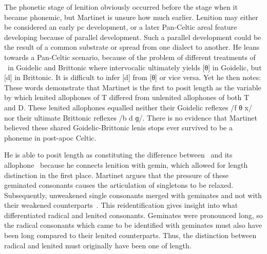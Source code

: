 The phonetic stage of lenition obviously occurred before the stage when it became phonemic, but Martinet is unsure how much earlier. Lenition may either be considered an early \acrlong{pc} development, or a later Pan-Celtic areal feature developing because of parallel development. Such a parallel development could be the result of a common substrate or spread from one dialect to another. He leans towards a Pan-Celtic scenario, because of the problem of different treatments of \lT\ in Goidelic and Brittonic where intervocalic  ultimately yields [θ] in Goidelic, but [d] in Brittonic. It is difficult to infer [d] from [θ] or vice versa. Yet he then notes:
These words demonstrate that Martinet is the first to posit length as the variable by which lenited allophones of \gls{T} differed from unlenited allophones of both \gls{T} and \gls{D}. These lenited allophones equalled neither their Goidelic reflexes /f θ x/ nor their ultimate Brittonic reflexes /b d ɡ/. There is no evidence that Martinet believed these shared Goidelic-Brittonic lenis stops ever survived to be a \gls{phoneme} in post-\gls{apoc} Celtic.

He is able to posit length as constituting the difference between \xT\ and its \gls{allophone} \lT\  because he connects lenition with \gls{gemin}, which allowed for length distinction in the first place. Martinet argues that  the pressure of these geminated consonants causes the articulation of singletons to be relaxed. Subsequently, unweakened single consonants merged with geminates and not with their weakened counterparts~\autocite[212]{martinet_celtic_1952}. This reidentification gives insight into what differentiated  radical and lenited consonants. Geminates were pronounced long, so the radical consonants which came to be identified with geminates must also have been long compared to their lenited counterparts. Thus, the distinction between radical and lenited must originally have been one of length.


